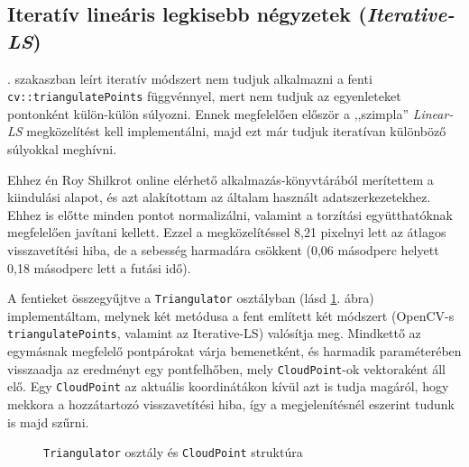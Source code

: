 \subsection{Iteratív lineáris legkisebb négyzetek (\textit{Iterative-LS})}

. szakaszban leírt iteratív módszert nem tudjuk alkalmazni a fenti \texttt{cv::triangulatePoints} függvénnyel, mert nem tudjuk az egyenleteket pontonként külön-külön súlyozni. Ennek megfelelően először a ,,szimpla'' \textit{Linear-LS} megközelítést kell implementálni, majd ezt már tudjuk iteratívan különböző súlyokkal meghívni.

Ehhez én Roy Shilkrot online elérhető alkalmazás-könyvtárából \cite{sfm-toy-library} merítettem a kiindulási alapot, és azt alakítottam az általam használt adatszerkezetekhez. Ehhez is előtte minden pontot normalizálni, valamint a torzítási együtthatóknak megfelelően javítani kellett. Ezzel a megközelítéssel 8,21 pixelnyi lett az átlagos visszavetítési hiba, de a sebesség harmadára csökkent (0,06 másodperc helyett 0,18 másodperc lett a futási idő). %

A fentieket összegyűjtve a \texttt{Triangulator} osztályban (lásd \ref{fig:cd:triangulator}. ábra) implementáltam, melynek két metódusa a fent említett két módszert (OpenCV-s \texttt{triangulatePoints}, valamint az Iterative-LS) valósítja meg. Mindkettő az egymásnak megfelelő pontpárokat várja bemenetként, és harmadik paraméterében visszaadja az eredményt egy pontfelhőben, mely \texttt{CloudPoint}-ok vektoraként áll elő. Egy \texttt{CloudPoint} az aktuális koordinátákon kívül azt is tudja magáról, hogy mekkora a hozzátartozó visszavetítési hiba, így a megjelenítésnél eszerint tudunk is majd szűrni.

\begin{figure}[tbh]
\centering


\caption{\texttt{Triangulator} osztály és \texttt{CloudPoint} struktúra \label{fig:cd:triangulator}}
\end{figure}


